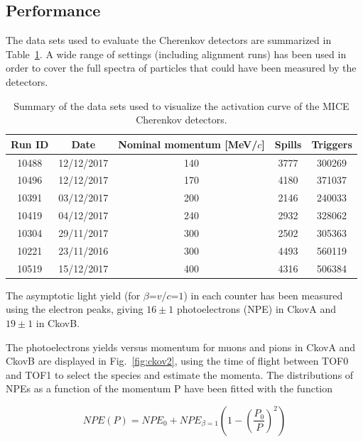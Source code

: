 \subsection{Performance}
\label{SubSect:Ckov_Performance}

The data sets used to evaluate the Cherenkov detectors are summarized in Table~\ref{tab:ckov}. A wide range of settings (including alignment runs) has been used in order to cover the full spectra of particles that could have been measured by the detectors.

\begin{table}
  \begin{center}
    \begin{tabular}{c|c|c|c|c}
       Run ID & Date & Nominal momentum [MeV/$c$] & Spills & Triggers \\
  		\hline
       10488  & 12/12/2017 & 140 & 3777 & 300269 \\
       10496  & 12/12/2017 & 170 & 4180 & 371037 \\
       10391  & 03/12/2017 & 200 & 2146 & 240033 \\
       10419  & 04/12/2017 & 240 & 2932 & 328062 \\
       10304  & 29/11/2017 & 300 & 2502 & 305363 \\
       10221  & 23/11/2016 & 300 & 4493 & 560119 \\
       10519  & 15/12/2017 & 400 & 4316 & 506384 \\
    \end{tabular}
   \caption{Summary of the data sets used to visualize the activation curve of the MICE Cherenkov detectors.}
   \label{tab:ckov}
  \end{center}
\end{table}

The asymptotic light yield (for $\beta$=$v$/$c$=$1$) in each counter has been measured using the electron peaks, giving $16\pm1$ photoelectrons (NPE) in CkovA and $19\pm1$ in CkovB.

The photoelectrons yields versus momentum for muons and pions in CkovA and CkovB are displayed in Fig.~\ref{fig:ckov2}, using the time of flight between TOF0 and TOF1 to select the species and estimate the momenta.
The distributions of NPEs as a function of the momentum P have been fitted with the function

\begin{equation}
NPE(P) = NPE_0 + NPE_{\beta=1}\left(1-\left(\frac{P_0}{P}\right)^2\right)
\end{equation}

